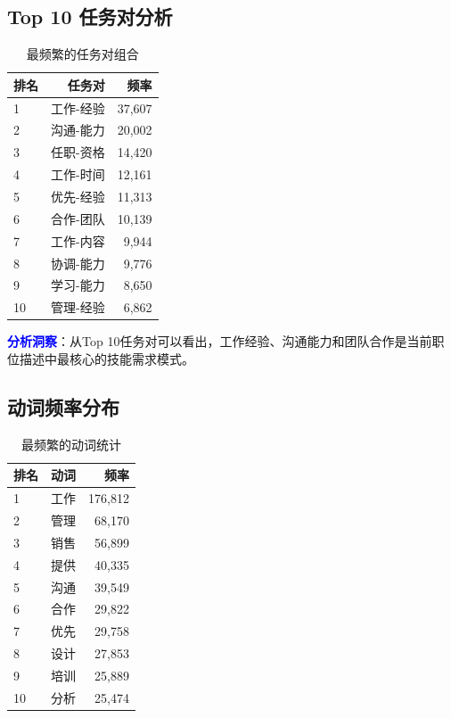 \documentclass[11pt,a4paper]{article}
\begin{document}
\subsection{Top 10 任务对分析}

\begin{table}[h]
\centering
\begin{tabular}{lrr}
\toprule
\textbf{排名} & \textbf{任务对} & \textbf{频率} \\
\midrule
1 & 工作-经验 & 37,607 \\
2 & 沟通-能力 & 20,002 \\
3 & 任职-资格 & 14,420 \\
4 & 工作-时间 & 12,161 \\
5 & 优先-经验 & 11,313 \\
6 & 合作-团队 & 10,139 \\
7 & 工作-内容 & 9,944 \\
8 & 协调-能力 & 9,776 \\
9 & 学习-能力 & 8,650 \\
10 & 管理-经验 & 6,862 \\
\bottomrule
\end{tabular}
\caption{最频繁的任务对组合}
\end{table}

\textcolor{blue}{\textbf{分析洞察}}：从Top 10任务对可以看出，工作经验、沟通能力和团队合作是当前职位描述中最核心的技能需求模式。

\subsection{动词频率分布}

\begin{table}[h]
\centering
\begin{tabular}{lrr}
\toprule
\textbf{排名} & \textbf{动词} & \textbf{频率} \\
\midrule
1 & 工作 & 176,812 \\
2 & 管理 & 68,170 \\
3 & 销售 & 56,899 \\
4 & 提供 & 40,335 \\
5 & 沟通 & 39,549 \\
6 & 合作 & 29,822 \\
7 & 优先 & 29,758 \\
8 & 设计 & 27,853 \\
9 & 培训 & 25,889 \\
10 & 分析 & 25,474 \\
\bottomrule
\end{tabular}
\caption{最频繁的动词统计}
\end{table}
\end{document}
